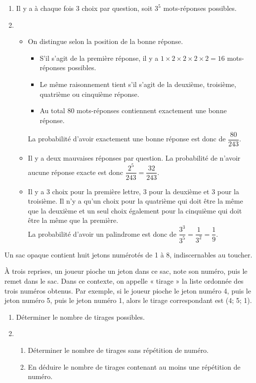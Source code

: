 \documentclass[11pt,fleqn, openany]{book} %
\begin{document}
\begin{solution}\hspace{0pt}
\vspace{-0.5cm}
\begin{enumerate}
\item Il y a à chaque fois 3 choix par question, soit $3^5$ mots-réponses possibles.
\item 
\begin{itemize}
\item  On distingue selon la position de la bonne réponse.
\begin{itemize}
\item S'il s'agit de la première réponse, il y a $1 \times 2 \times 2 \times 2 \times 2 = 16$ mots-réponses possibles.
\item Le même raisonnement tient s'il s'agit de la deuxième, troisième, quatrième ou cinquième réponse.
\item Au total 80 mots-réponses contiennent exactement une bonne réponse.
\end{itemize}
La probabilité d'avoir exactement une bonne réponse est donc de $\dfrac{80}{243}$.
\item Il y a deux mauvaises réponses par question. La probabilité de n'avoir aucune réponse exacte est donc $\dfrac{2^5}{243}=\dfrac{32}{243}$.
\item Il y a 3 choix pour la première lettre, 3 pour la deuxième et 3 pour la troisième. Il n'y a qu'un choix pour la quatrième qui doit être la même que la deuxième et un seul choix également pour la cinquième qui doit être la même que la première. \\La probabilité d'avoir un palindrome est donc de $\dfrac{3^3}{3^5}=\dfrac{1}{3^2}=\dfrac{1}{9}$.\end{itemize}
\end{enumerate}\end{solution}

\begin{exercise}[subtitle={(Centres étrangers 2024)}]

Un sac opaque contient huit jetons numérotés de 1 à 8, indiscernables au toucher.

À trois reprises, un joueur pioche un jeton dans ce sac, note son numéro, puis le remet dans le sac. Dans ce contexte, on appelle « tirage » la liste ordonnée des trois numéros obtenus.
Par exemple, si le joueur pioche le jeton numéro 4, puis le jeton numéro 5, puis le jeton numéro 1, alors le tirage correspondant est (4; 5; 1).
\begin{enumerate}
\item Déterminer le nombre de tirages possibles.
\item\begin{enumerate}
\item Déterminer le nombre de tirages sans répétition de numéro.
\item En déduire le nombre de tirages contenant au moins une répétition de numéro.\end{enumerate}\end{enumerate}

\end{exercise}
\end{document}
